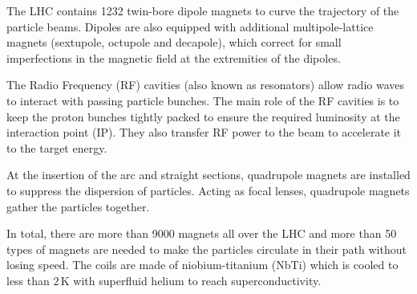 The LHC contains %
1232 twin-bore dipole magnets to curve the trajectory of the particle beams. %
Dipoles are also equipped with additional multipole-lattice magnets (sextupole, octupole and decapole), which correct for small imperfections 
in the magnetic field at the extremities of the dipoles. 


The Radio Frequency (RF) cavities (also known as resonators) %
allow radio waves to interact with passing particle bunches. The main role of
the RF cavities is to keep the proton bunches tightly packed to ensure the required luminosity at
the interaction point (IP). They also transfer RF power to the beam to accelerate it to the target energy.

At the insertion of the arc and straight sections, quadrupole magnets are installed to suppress
the dispersion of particles. Acting as focal lenses, quadrupole magnets gather the particles 
together.  %

In total, there are more than 9000 magnets all over the LHC and more than 50 types of magnets are needed to
 make the particles circulate in their path without losing speed.
The coils are made of niobium-titanium (NbTi)  which is cooled to less than $2\,$K with superfluid helium to reach superconductivity. 

